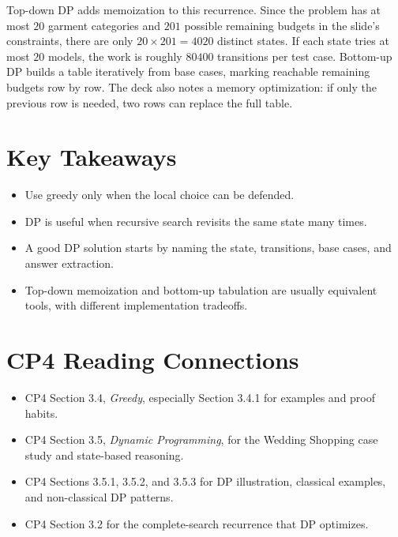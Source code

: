 \documentclass[11pt]{article}
\begin{document}
Top-down DP adds memoization to this recurrence. Since the problem has at most \(20\) garment categories and \(201\) possible remaining budgets in the slide's constraints, there are only \(20 \times 201 = 4020\) distinct states. If each state tries at most \(20\) models, the work is roughly \(80400\) transitions per test case. Bottom-up DP builds a table iteratively from base cases, marking reachable remaining budgets row by row. The deck also notes a memory optimization: if only the previous row is needed, two rows can replace the full table.

\section*{Key Takeaways}
\begin{itemize}
  \item Use greedy only when the local choice can be defended.
  \item DP is useful when recursive search revisits the same state many times.
  \item A good DP solution starts by naming the state, transitions, base cases, and answer extraction.
  \item Top-down memoization and bottom-up tabulation are usually equivalent tools, with different implementation tradeoffs.
\end{itemize}

\section*{CP4 Reading Connections}
\begin{itemize}
  \item CP4 Section 3.4, \textit{Greedy}, especially Section 3.4.1 for examples and proof habits.
  \item CP4 Section 3.5, \textit{Dynamic Programming}, for the Wedding Shopping case study and state-based reasoning.
  \item CP4 Sections 3.5.1, 3.5.2, and 3.5.3 for DP illustration, classical examples, and non-classical DP patterns.
  \item CP4 Section 3.2 for the complete-search recurrence that DP optimizes.
\end{itemize}
\end{document}
